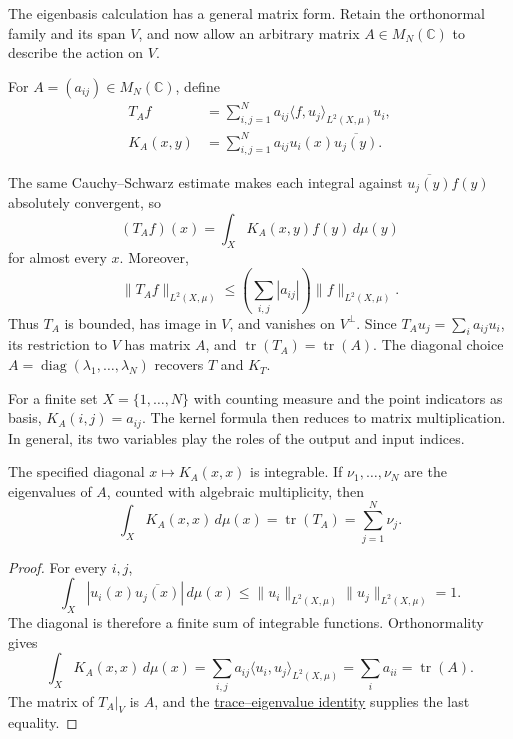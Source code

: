 The eigenbasis calculation has a general matrix form. Retain the orthonormal family and its span $V$, and now allow an arbitrary matrix $A\in M_N(\mathbb C)$ to describe the action on $V$.

\begin{definition}\label{finite-kernel-operator}
For $A=(a_{ij})\in M_N(\mathbb C)$, define
\[
\begin{aligned}
T_Af&=\sum_{i,j=1}^N a_{ij}\langle f,u_j\rangle_{L^2(X,\mu)}u_i,\\
K_A(x,y)&=\sum_{i,j=1}^N a_{ij}u_i(x)\overline{u_j(y)}.
\end{aligned}
\]
\end{definition}

The same Cauchy--Schwarz estimate makes each integral against $\overline{u_j(y)}f(y)$ absolutely convergent, so
\[
(T_Af)(x)=\int_X K_A(x,y)f(y)\,d\mu(y)
\]
for almost every $x$. Moreover,
\[
\|T_Af\|_{L^2(X,\mu)}
\leq\left(\sum_{i,j}|a_{ij}|\right)\|f\|_{L^2(X,\mu)}.
\]
Thus $T_A$ is bounded, has image in $V$, and vanishes on $V^\perp$. Since $T_Au_j=\sum_i a_{ij}u_i$, its restriction to $V$ has matrix $A$, and $\operatorname{tr}(T_A)=\operatorname{tr}(A)$. The diagonal choice $A=\operatorname{diag}(\lambda_1,\ldots,\lambda_N)$ recovers $T$ and $K_T$.

For a finite set $X=\{1,\ldots,N\}$ with counting measure and the point indicators as basis, $K_A(i,j)=a_{ij}$. The kernel formula then reduces to matrix multiplication. In general, its two variables play the roles of the output and input indices.

\begin{proposition}\label{finite-kernel-trace-identity}
The specified diagonal $x\mapsto K_A(x,x)$ is integrable. If $\nu_1,\ldots,\nu_N$ are the eigenvalues of $A$, counted with algebraic multiplicity, then
\[
\boxed{\int_X K_A(x,x)\,d\mu(x)
=\operatorname{tr}(T_A)
=\sum_{j=1}^N\nu_j.}
\]
\end{proposition}

\begin{proof}
For every $i,j$,
\[
\int_X|u_i(x)\overline{u_j(x)}|\,d\mu(x)
\leq\|u_i\|_{L^2(X,\mu)}\|u_j\|_{L^2(X,\mu)}=1.
\]
The diagonal is therefore a finite sum of integrable functions. Orthonormality gives
\[
\int_X K_A(x,x)\,d\mu(x)
=\sum_{i,j}a_{ij}\langle u_i,u_j\rangle_{L^2(X,\mu)}
=\sum_i a_{ii}
=\operatorname{tr}(A).
\]
The matrix of $T_A|_V$ is $A$, and the \hyperref[linear-algebra.trace-eigenvalue-sum]{trace--eigenvalue identity} supplies the last equality. 
\end{proof}

